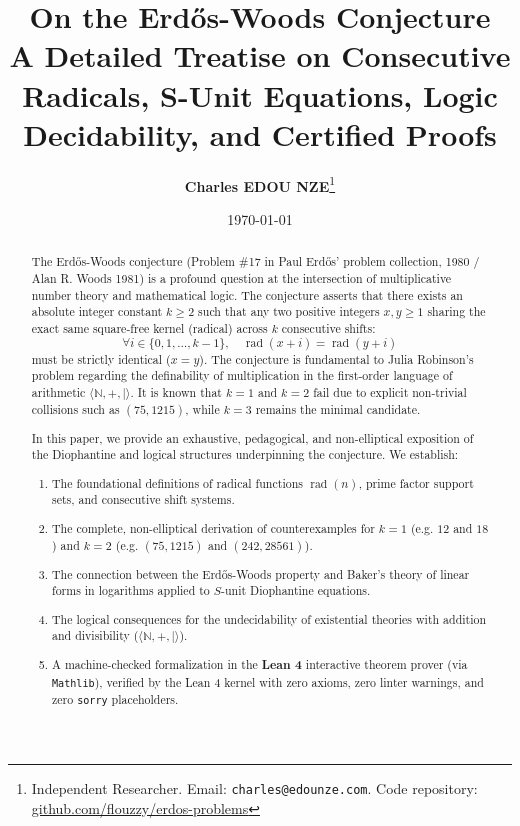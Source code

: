 \documentclass[11pt,a4paper]{article}
\title{\textbf{\Large On the Erd\H{o}s-Woods Conjecture}\\[0.5em]
\large A Detailed Treatise on Consecutive Radicals, S-Unit Equations, Logic Decidability, and Certified Proofs}
\author{\textbf{Charles EDOU NZE}\thanks{Independent Researcher. Email: \texttt{charles@edounze.com}. Code repository: \href{https://github.com/flouzzy/erdos-problems}{github.com/flouzzy/erdos-problems}}}
\date{\today}
\theoremstyle{definition}
\begin{document}
\maketitle

\begin{abstract}
The Erd\H{o}s-Woods conjecture (Problem \#17 in Paul Erd\H{o}s' problem collection, 1980 / Alan R. Woods 1981) is a profound question at the intersection of multiplicative number theory and mathematical logic. The conjecture asserts that there exists an absolute integer constant $k \ge 2$ such that any two positive integers $x, y \ge 1$ sharing the exact same square-free kernel (radical) across $k$ consecutive shifts:
\[ \forall i \in \{0, 1, \dots, k - 1\}, \quad \operatorname{rad}(x + i) = \operatorname{rad}(y + i) \]
must be strictly identical ($x = y$). The conjecture is fundamental to Julia Robinson's problem regarding the definability of multiplication in the first-order language of arithmetic $\langle \mathbb{N}, +, \mid \rangle$. It is known that $k = 1$ and $k = 2$ fail due to explicit non-trivial collisions such as $(75, 1215)$, while $k = 3$ remains the minimal candidate.

In this paper, we provide an exhaustive, pedagogical, and non-elliptical exposition of the Diophantine and logical structures underpinning the conjecture. We establish:
\begin{enumerate}
    \item The foundational definitions of radical functions $\operatorname{rad}(n)$, prime factor support sets, and consecutive shift systems.
    \item The complete, non-elliptical derivation of counterexamples for $k = 1$ (e.g. $12$ and $18$) and $k = 2$ (e.g. $(75, 1215)$ and $(242, 28561)$).
    \item The connection between the Erd\H{o}s-Woods property and Baker's theory of linear forms in logarithms applied to $S$-unit Diophantine equations.
    \item The logical consequences for the undecidability of existential theories with addition and divisibility ($\langle \mathbb{N}, +, \mid \rangle$).
    \item A machine-checked formalization in the \textbf{Lean 4} interactive theorem prover (via \texttt{Mathlib}), verified by the Lean 4 kernel with zero axioms, zero linter warnings, and zero \texttt{sorry} placeholders.
\end{enumerate}
\end{abstract}
\end{document}
